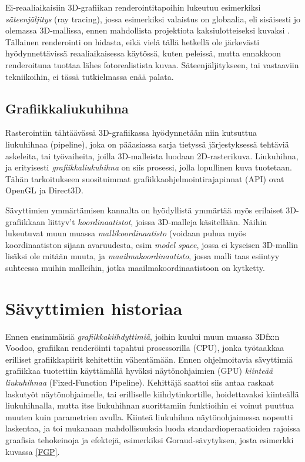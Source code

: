 \documentclass[finnish]{tktltiki2}
\theoremstyle{definition}
\theoremstyle{remark}
\begin{document}
Ei-reaaliaikaisiin 3D-grafiikan renderointitapoihin lukeutuu esimerkiksi \emph{säteenjäljitys} (ray tracing), jossa esimerkiksi valaistus on globaalia, eli sisäisesti jo olemassa 3D-mallissa, ennen mahdollista projektiota kaksiulotteiseksi kuvaksi \cite{Puh08}. Tällainen renderointi on hidasta, eikä vielä tällä hetkellä ole järkevästi hyödynnettävissä reaaliaikaisessa käytössä, kuten peleissä, mutta ennakkoon renderoituna tuottaa lähes fotorealistista kuvaa. Säteenjäljitykseen, tai vastaaviin tekniikoihin, ei tässä tutkielmassa enää palata.

\subsection{Grafiikkaliukuhihna}
Rasterointiin tähtäävässä 3D-grafiikassa hyödynnetään niin kutsuttua liukuhihnaa (pipeline), joka on pääasiassa sarja tietyssä järjestyksessä tehtäviä askeleita, tai työvaiheita, joilla 3D-malleista luodaan 2D-rasterikuva. Liukuhihna, ja erityisesti \emph{grafiikkaliukuhihna} on siis prosessi, jolla lopullinen kuva tuotetaan. Tähän tarkoitukseen suosituimmat grafiikkaohjelmointirajapinnat (API) ovat OpenGL ja Direct3D.

Sävyttimien ymmärtämisen kannalta on hyödyllistä ymmärtää myös erilaiset 3D-grafiikkaan liittyv't \emph{koordinaatistot}, joissa 3D-malleja käsitellään. Näihin lukeutuvat muun muassa \emph{mallikoordinaatisto} (voidaan puhua myös koordinaatiston sijaan avaruudesta, esim \emph{model space}, jossa ei kyseisen 3D-mallin lisäksi ole mitään muuta, ja \emph{maailmakoordinaatisto}, jossa malli taas esiintyy suhteessa muihin malleihin, jotka maailmakoordinaatistoon on kytketty.

\section{Sävyttimien historiaa}

Ennen ensimmäisiä \emph{grafiikkakiihdyttimiä}, joihin kuului muun muassa 3Dfx:n Voodoo, grafiikan renderöinti tapahtui prosessorilla (CPU), jonka työtaakkaa erilliset grafiikkapiirit kehitettiin vähentämään. Ennen ohjelmoitavia sävyttimiä grafiikkaa tuotettiin käyttämällä hyväksi näytönohjaimien (GPU) \emph{kiinteää liukuhihnaa} (Fixed-Function Pipeline). Kehittäjä saattoi siis antaa raskaat laskutyöt näytönohjaimelle, tai erilliselle kiihdytinkortille, hoidettavaksi kiinteällä liukuhihnalla, mutta itse liukuhihnan suorittamiin funktioihin ei voinut puuttua muuten kuin parametrien avulla. Kiinteä liukuhihna näytönohjaimessa nopeutti laskentaa, ja toi mukanaan mahdollisuuksia luoda standardioperaatioiden rajoissa graafisia tehokeinoja ja efektejä, esimerkiksi Goraud-sävytyksen, josta esimerkki kuvassa \ref{FGP}.
\end{document}
